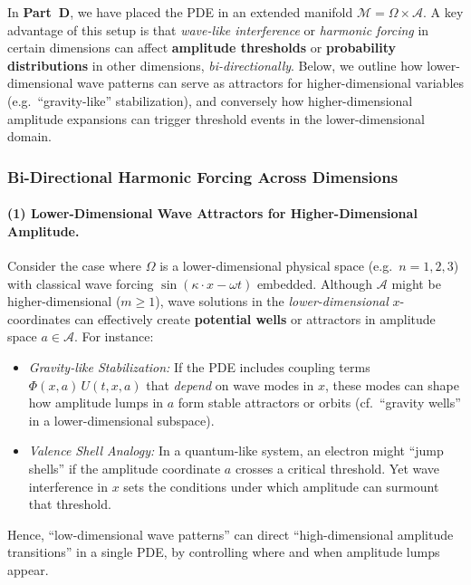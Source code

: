 \documentclass[12pt]{article}
\begin{document}
In \textbf{Part~D}, we have placed the PDE in an extended manifold 
\(\mathcal{M}=\Omega\times\mathcal{A}\). A key advantage of this setup is that 
\emph{wave-like interference} or \emph{harmonic forcing} in certain dimensions can 
affect \textbf{amplitude thresholds} or \textbf{probability distributions} in other dimensions, 
\emph{bi-directionally}. Below, we outline how lower-dimensional wave patterns can serve 
as attractors for higher-dimensional variables (e.g.\ “gravity-like” stabilization), and 
conversely how higher-dimensional amplitude expansions can trigger threshold events in 
the lower-dimensional domain.

\subsubsection{Bi-Directional Harmonic Forcing Across Dimensions}
\label{subsubsec:bi_directional_influence}

\paragraph{(1) Lower-Dimensional Wave Attractors for Higher-Dimensional Amplitude.}
\label{subsec:lower_dim_prob}
Consider the case where $\Omega$ is a lower-dimensional physical space (e.g.\ $n=1,2,3$) 
with classical wave forcing $\sin(\kappa \cdot x - \omega t)$ embedded. 
Although $\mathcal{A}$ might be higher-dimensional ($m\ge1$), wave solutions in the 
\emph{lower-dimensional} $x$-coordinates can effectively create \textbf{potential wells} 
or attractors in amplitude space $a\in\mathcal{A}$. 
For instance:
\begin{itemize}
  \item \emph{Gravity-like Stabilization:} If the PDE includes coupling terms 
        $\Phi(x,a)\,U(t,x,a)$ that \emph{depend} on wave modes in $x$, these modes can 
        shape how amplitude lumps in $a$ form stable attractors or orbits 
        (cf.\ “gravity wells” in a lower-dimensional subspace).
  \item \emph{Valence Shell Analogy:} In a quantum-like system, an electron might 
        “jump shells” if the amplitude coordinate $a$ crosses a critical threshold.  
        Yet wave interference in $x$ sets the conditions under which amplitude 
        can surmount that threshold. 
\end{itemize}
Hence, “low-dimensional wave patterns” can direct “high-dimensional amplitude transitions” 
in a single PDE, by controlling where and when amplitude lumps appear.
\end{document}
